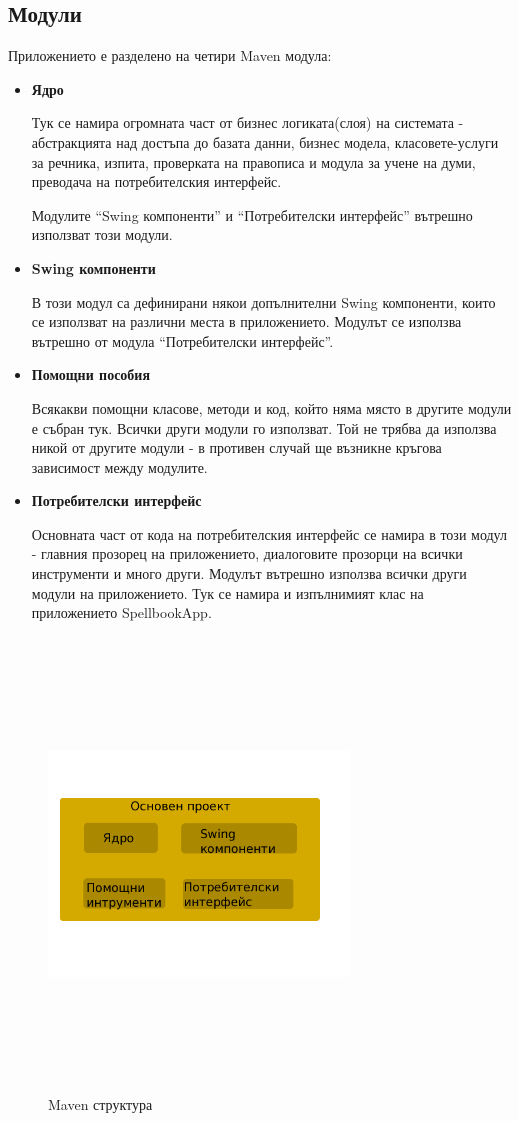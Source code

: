 \subsection{Модули}
Приложението е разделено на четири Maven модула:
\begin{itemize}
\item \textbf{Ядро}

Тук се намира огромната част от бизнес логиката(слоя) на системата -
абстракцията над достъпа до базата данни, бизнес модела,
класовете-услуги за речника, изпита, проверката на правописа и модула
за учене на думи, преводача на потребителския интерфейс.

Модулите "`Swing компоненти"' и "`Потребителски интерфейс"' вътрешно
използват този модули. 
\item \textbf{Swing компоненти}

В този модул са дефинирани някои допълнителни Swing компоненти, които
се използват на различни места в приложението. Модулът се използва
вътрешно от модула "`Потребителски интерфейс"'.
\item \textbf{Помощни пособия}

Всякакви помощни класове, методи и код, който няма място в другите
модули е събран тук. Всички други модули го използват. Той не трябва
да използва никой от другите модули - в противен случай ще възникне
кръгова зависимост между модулите.
\item \textbf{Потребителски интерфейс}

Основната част от кода на потребителския интерфейс се намира в този
модул - главния прозорец на приложението, диалоговите прозорци на
всички инструменти и много други. Модулът вътрешно използва всички
други модули на приложението. Тук се намира и изпълнимият клас на
приложението SpellbookApp. 
\end{itemize}
\begin{figure}[htbp]
  \caption{Maven структура}
  \centering
  \includegraphics[width=80mm, height=120mm]{images/maven_modules.png}
\end{figure}
    
